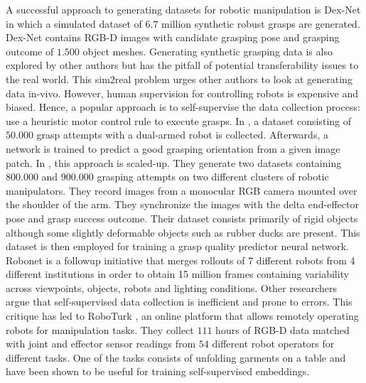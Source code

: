 \documentclass[\home/main.tex]{subfiles}
\begin{document}
A successful approach to generating datasets for robotic manipulation is Dex-Net \autocite{dexnet2} in which a simulated dataset of $6.7$ million synthetic robust grasps are generated. Dex-Net contains RGB-D images with candidate grasping pose and grasping outcome of $1.500$ object meshes. Generating synthetic grasping data is also explored by other authors \autocite{depierre2018jacquard,redmon2015real} but has the pitfall of potential transferability issues to the real world. This sim2real problem urges other authors to look at generating data in-vivo. However, human supervision for controlling robots is expensive and biased. Hence, a popular approach is to self-supervise the data collection process: use a heuristic motor control rule to execute grasps. In \autocite{pinto2016supersizing}, a dataset consisting of $50.000$ grasp attempts with a dual-armed robot is collected. Afterwards, a network is trained to predict a good grasping orientation from a given image patch.
In \autocite{Levine2016}, this approach is scaled-up. They generate two datasets containing $800.000$ and $900.000$ grasping attempts on two different clusters of robotic manipulators. They record images from a monocular RGB camera mounted over the shoulder of the arm. They synchronize the images with the delta end-effector pose and grasp success outcome. Their dataset consists primarily of rigid objects although some slightly deformable objects such as rubber ducks are present. This dataset is then employed for training a grasp quality predictor neural network.
Robonet \autocite{dasari2019robonet} is a followup initiative that merges rollouts of 7 different robots from 4 different institutions in order to obtain 15 million frames containing variability across viewpoints, objects, robots and lighting conditions.
Other researchers \autocite{mandlekar2018roboturk} argue that self-supervised data collection is inefficient and prone to errors. This critique has led to RoboTurk \autocite{mandlekar2018roboturk}, an online platform that allows remotely operating robots for manipulation tasks. They collect $111$ hours of RGB-D data matched with joint and effector sensor readings from $54$ different robot operators for different tasks. One of the tasks consists of unfolding garments on a table and have been shown to be useful for training self-supervised embeddings.
\end{document}
